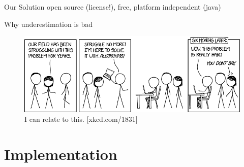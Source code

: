 \documentclass[xcolor=x11names, aspectratio=169,usenames,dvipsnames]{beamer}
\begin{document}
\begin{frame}{Our Solution}
open source (license!), free, platform independent (java)
\end{frame}

\begin{frame}{Why underestimation is bad}
\begin{center}
\begin{figure}
	\includegraphics[width=\textwidth]{img/xkcd.png}
	\caption{I can relate to this. [xkcd.com/1831]}
\end{figure}
\end{center}
\end{frame}

\section{Implementation}
\end{document}
